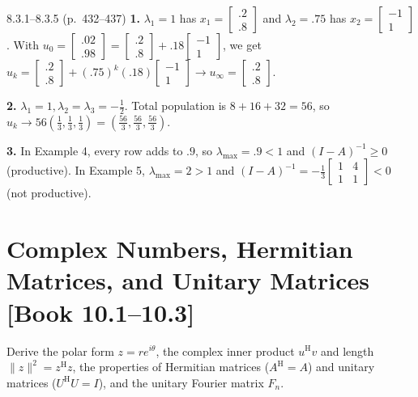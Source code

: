 \documentclass[11pt,a4paper,openany,oneside]{book}
\def\vect#1{#1}%
\def\mathbf#1{#1}%
\def\bk#1{ [Book #1]}%
\newcommand{\vect}[1]{\mathbf{#1}}
\newcommand{\Herm}{\mathrm{H}}
\numberwithin{equation}{chapter}
\newcommand{\bk}[1]{\texorpdfstring{\enspace{\normalfont\small\color{slate}[Book #1]}}{ [Book #1]}}
\begin{document}
\vfill
\begin{pageend_sol}{8.3.1--8.3.5 (p.\ 432--437)}
\textbf{1.} $\lambda_1 = 1$ has $\vect{x}_1 = \begin{bmatrix}.2\\.8\end{bmatrix}$ and $\lambda_2 = .75$ has $\vect{x}_2 = \begin{bmatrix}-1\\1\end{bmatrix}$. With $\vect{u}_0 = \begin{bmatrix}.02\\.98\end{bmatrix} = \begin{bmatrix}.2\\.8\end{bmatrix} + .18\begin{bmatrix}-1\\1\end{bmatrix}$, we get $\vect{u}_k = \begin{bmatrix}.2\\.8\end{bmatrix} + (.75)^k(.18)\begin{bmatrix}-1\\1\end{bmatrix} \to \vect{u}_\infty = \begin{bmatrix}.2\\.8\end{bmatrix}$.

\textbf{2.} $\lambda_1 = 1, \lambda_2 = \lambda_3 = -\frac{1}{2}$. Total population is $8+16+32 = 56$, so $\vect{u}_k \to 56\left(\frac{1}{3}, \frac{1}{3}, \frac{1}{3}\right) = \left(\frac{56}{3}, \frac{56}{3}, \frac{56}{3}\right)$.

\textbf{3.} In Example 4, every row adds to $.9$, so $\lambda_{\max} = .9 < 1$ and $(I-A)^{-1} \ge 0$ (productive). In Example 5, $\lambda_{\max} = 2 > 1$ and $(I-A)^{-1} = -\frac{1}{3}\begin{bmatrix}1&4\\1&1\end{bmatrix} < 0$ (not productive).
\end{pageend_sol}
\clearpage

\section{Complex Numbers, Hermitian Matrices, and Unitary Matrices\bk{10.1--10.3}}

\begin{goal}
Derive the polar form $z = re^{i\theta}$, the complex inner product $\vect{u}^\Herm\vect{v}$ and length $\|\vect{z}\|^2 = \vect{z}^\Herm\vect{z}$, the properties of Hermitian matrices ($A^\Herm = A$) and unitary matrices ($U^\Herm U = I$), and the unitary Fourier matrix $F_n$.
\end{goal}
\end{document}
